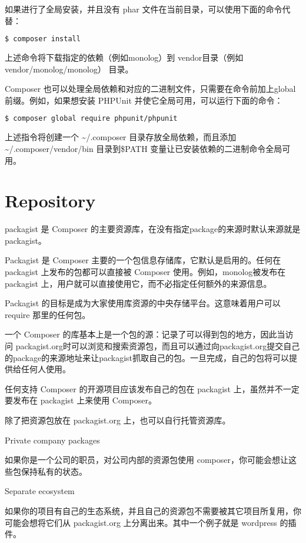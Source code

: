 如果进行了全局安装，并且没有 phar 文件在当前目录，可以使用下面的命令代替：

\begin{lstlisting}[language=bash]
$ composer install
\end{lstlisting}

上述命令将下载指定的依赖（例如monolog）到 vendor目录（例如vendor/monolog/monolog） 目录。

Composer 也可以处理全局依赖和对应的二进制文件，只需要在命令前加上global前缀。例如，如果想安装 PHPUnit 并使它全局可用，可以运行下面的命令：

\begin{lstlisting}[language=bash]
$ composer global require phpunit/phpunit
\end{lstlisting}

上述指令将创建一个 \~{}/.composer 目录存放全局依赖，而且添加\~{}/.composer/vendor/bin 目录到\$PATH 变量让已安装依赖的二进制命令全局可用。


\section{Repository}

packagist 是 Composer 的主要资源库，在没有指定package的来源时默认来源就是packagist。

Packagist 是 Composer 主要的一个包信息存储库，它默认是启用的。任何在 packagist 上发布的包都可以直接被 Composer 使用。例如，monolog被发布在 packagist 上，用户就可以直接使用它，而不必指定任何额外的来源信息。

Packagist 的目标是成为大家使用库资源的中央存储平台。这意味着用户可以 require 那里的任何包。

一个 Composer 的库基本上是一个包的源：记录了可以得到包的地方，因此当访问 packagist.org时可以浏览和搜索资源包，而且可以通过向packagist.org提交自己的package的来源地址来让packagist抓取自己的包。一旦完成，自己的包将可以提供给任何人使用。

任何支持 Composer 的开源项目应该发布自己的包在 packagist 上，虽然并不一定要发布在 packagist 上来使用 Composer。

除了把资源包放在 packagist.org 上，也可以自行托管资源库。

\begin{compactitem}
\item Private company packages

如果你是一个公司的职员，对公司内部的资源包使用 composer，你可能会想让这些包保持私有的状态。

\item Separate ecosystem

如果你的项目有自己的生态系统，并且自己的资源包不需要被其它项目所复用，你可能会想将它们从 packagist.org 上分离出来。其中一个例子就是 wordpress 的插件。
\end{compactitem}


